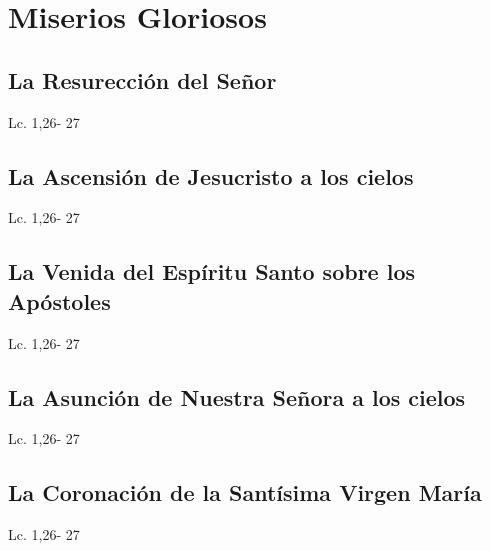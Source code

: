 \documentclass[a4paper,11pt,sans]{article}
\begin{document}
  \section*{\hfil Miserios Gloriosos \hfil}
    \subsection*{\hfil La Resurección del Señor \hfil}
      \begin{multicols}{2}

      \columnbreak
                           
      \end{multicols}
      \begin{center}
        Lc. 1,26- 27           
      \end{center}
    \subsection*{\hfil La Ascensión de Jesucristo a los cielos \hfil}
      \begin{multicols}{2}

      \columnbreak
                           
      \end{multicols}         
      \begin{center}
        Lc. 1,26- 27           
      \end{center}
    \subsection*{\hfil La Venida del Espíritu Santo sobre los Apóstoles \hfil}
      \begin{multicols}{2}

      \columnbreak
                           
      \end{multicols}         
      \begin{center}
        Lc. 1,26- 27           
      \end{center}
    \subsection*{\hfil La Asunción de Nuestra Señora a los cielos \hfil}
      \begin{multicols}{2}

      \columnbreak
                           
      \end{multicols}         
      \begin{center}
        Lc. 1,26- 27           
      \end{center}
    \subsection*{\hfil La Coronación de la Santísima Virgen María \hfil}
      \begin{multicols}{2}

      \columnbreak
                           
      \end{multicols}         
      \begin{center}
        Lc. 1,26- 27           
      \end{center}
\end{document}
